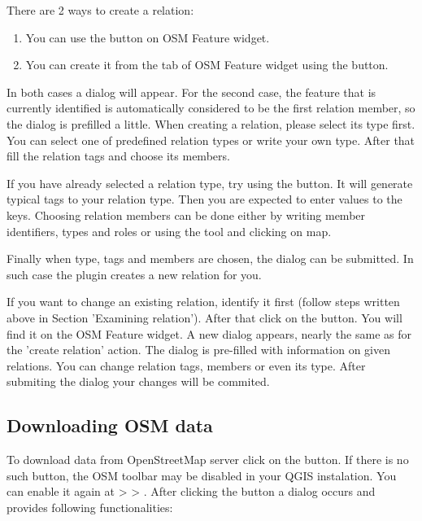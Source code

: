 
There are 2 ways to create a relation: 

\begin{enumerate}
\item You can use the  
button on OSM Feature widget.
\item You can create it from the  tab of OSM Feature widget 
using the  button.   
\end{enumerate}

In both cases a dialog will appear. For the second case, the feature that 
is currently identified is automatically considered to be the first 
relation member, so the dialog is prefilled a little. When creating 
a relation, please select its type first. You can select one of 
predefined relation types or write your own type. After that fill the 
relation tags and choose its members.

If you have already selected a relation type, try using the 
 button. It will generate typical 
tags to your relation type. Then you are expected to enter values to the 
keys. Choosing relation members can be done either by writing member 
identifiers, types and roles or using the  
tool and clicking on map.

Finally when type, tags and members are chosen, the dialog can be submitted.
In such case the plugin creates a new relation for you.


If you want to change an existing relation, identify it first (follow steps
written above in Section 'Examining relation'). After that click on the 
 button. You will find it 
on the OSM Feature widget. A new dialog appears, nearly the same as for the 
'create relation' action. The dialog is pre-filled with information on 
given relations. You can change relation tags, members or even its type. 
After submiting the dialog your changes will be commited.

\subsection{Downloading OSM data}  

To download data from OpenStreetMap server click on the 
 button. If there is no 
such button, the OSM toolbar may be disabled in your QGIS instalation.
You can enable it again at  > 
 > . After clicking the 
button a dialog occurs and provides following functionalities:

